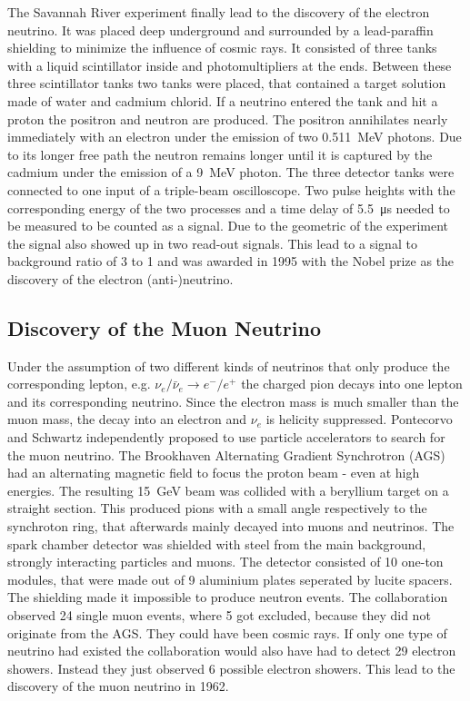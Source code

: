 The Savannah River experiment finally lead to the discovery of the electron neutrino. It was placed deep underground and surrounded by a lead-paraffin shielding to minimize the influence of cosmic rays. It consisted of three tanks with a liquid scintillator inside and photomultipliers at the ends. Between these three scintillator tanks two tanks were placed, that contained a target solution made of water and cadmium chlorid. If a neutrino entered the tank and hit a proton the positron and neutron are produced. The positron annihilates nearly immediately with an electron under the emission of two \SI{0.511}{\mega\electronvolt} photons. Due to its longer free path the neutron remains longer until it is captured by the cadmium under the emission of a \SI{9}{\mega\electronvolt} photon. The three detector tanks were connected to one input of a triple-beam oscilloscope. Two pulse heights with the corresponding energy of the two processes and a time delay of \SI{5.5}{\micro\second} needed to be measured to be counted as a signal. Due to the geometric of the experiment the signal also showed up in two read-out signals. This lead to a signal to background ratio of 3 to 1 and was awarded in 1995 with the Nobel prize as the discovery of the electron (anti-)neutrino.

\subsection{Discovery of the Muon Neutrino}
Under the assumption of two different kinds of neutrinos that only produce the corresponding lepton, e.g. $\nu_{e}/\bar{\nu}_e \rightarrow e^{-}/e^{+}$ the charged pion decays into one lepton and its corresponding neutrino. Since the electron mass is much smaller than the muon mass, the decay into an electron and $\nu_{e}$ is helicity suppressed.
Pontecorvo and Schwartz independently proposed to use particle accelerators to search for the muon neutrino. The Brookhaven Alternating Gradient Synchrotron (AGS) had an alternating magnetic field to focus the proton beam - even at high energies. The resulting \SI{15}{\giga\electronvolt} beam was collided with a beryllium target on a straight section. This produced pions with a small angle respectively to the synchroton ring, that afterwards mainly decayed into muons and neutrinos. The spark chamber detector was shielded with steel from the main background, strongly interacting particles and muons. The detector consisted of 10 one-ton modules, that were made out of 9 aluminium plates seperated by lucite spacers. The shielding made it impossible to produce neutron events. The collaboration observed 24 single muon events, where 5 got excluded, because they did not originate from the AGS. They could have been cosmic rays. If only one type of neutrino had existed the collaboration would also have had to detect 29 electron showers. Instead they just observed 6 possible electron showers. This lead to the discovery of the muon neutrino in 1962.

